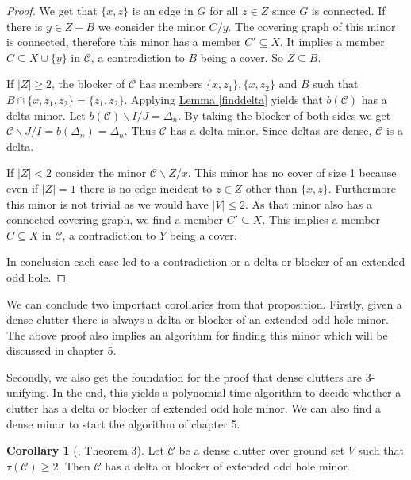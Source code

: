 \documentclass[a4paper, 12pt]{scrbook}
\theoremstyle{definition}
\newtheorem{corollary}[theorem]{Corollary}
\begin{document}
\begin{proof}
       We get that $\{x,z\}$ is an edge in $G$ for all $z \in Z$ since $G$ is connected.
       If there is $y \in Z-B$ we consider the minor $C / y$.
       The covering graph of this minor is connected, therefore this minor has a member $C' \subseteq X$. It implies a member $C \subseteq X \cup \{y\}$ in $\mathcal{C}$, a contradiction to $B$ being a cover. So $Z \subseteq B$.

       If $|Z|\geq 2$, the blocker of $\mathcal{C}$ has members $\{x,z_1\},\{x,z_2\}$ and $B$ such that $B \cap \{x,z_1,z_2\}=\{z_1,z_2\}$. Applying \hyperref[finddelta]{Lemma \ref*{finddelta}} yields that $b(\mathcal{C})$ has a delta minor. Let $b(\mathcal{C})\backslash I /J=\Delta_n$. By taking the blocker of both sides we get $\mathcal{C} \backslash J / I = b(\Delta_n)=\Delta_n$.
       Thus $\mathcal{C}$ has a delta minor. Since deltas are dense, $\mathcal{C}$ is a delta.

       If $|Z|<2$ consider the minor $\mathcal{C}\backslash Z /x$. This minor has no cover of size 1 because even if $|Z|=1$ there is no edge incident to $z \in Z$ other than $\{x,z\}$. Furthermore this minor is not trivial as we would have $|V|\leq 2$.
       As that minor also has a connected covering graph, we find a member $C' \subseteq X$. This implies a member $C \subseteq X$ in $\mathcal{C}$, a contradiction to $Y$ being a cover.

       In conclusion each case led to a contradiction or a delta or blocker of an extended odd hole.

   \end{proof}

   We can conclude two important corollaries from that proposition. Firstly, given a dense clutter there is always a delta or blocker of an extended odd hole minor. The above proof also implies an algorithm for finding this minor which will be discussed in chapter 5.

   Secondly, we also get the foundation for the proof that dense clutters are 3-unifying. In the end, this yields a polynomial time algorithm to decide whether a clutter has a delta or blocker of extended odd hole minor. We can also find a dense minor to start the algorithm of chapter 5.

   \begin{corollary}[\cite{deltas}, Theorem 3]\label{findminor}
       Let $\mathcal{C}$ be a dense clutter over ground set $V$ such that $\tau(\mathcal{C}) \geq 2$.
       Then $\mathcal{C}$ has a delta or blocker of extended odd hole minor.
   \end{corollary}
\end{document}
